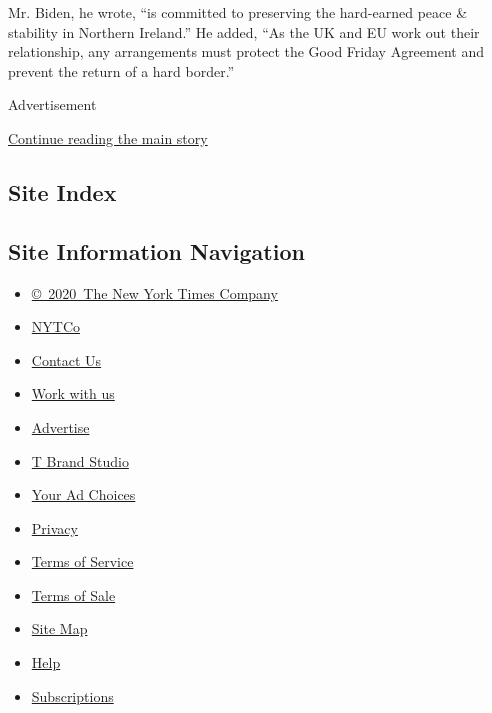 Mr. Biden, he wrote, ``is committed to preserving the hard-earned peace
\& stability in Northern Ireland.'' He added, ``As the UK and EU work
out their relationship, any arrangements must protect the Good Friday
Agreement and prevent the return of a hard border.''

Advertisement

\protect\hyperlink{after-bottom}{Continue reading the main story}

\hypertarget{site-index}{%
\subsection{Site Index}\label{site-index}}

\hypertarget{site-information-navigation}{%
\subsection{Site Information
Navigation}\label{site-information-navigation}}

\begin{itemize}
\tightlist
\item
  \href{https://help.nytimes3xbfgragh.onion/hc/en-us/articles/115014792127-Copyright-notice}{©~2020~The
  New York Times Company}
\end{itemize}

\begin{itemize}
\tightlist
\item
  \href{https://www.nytco.com/}{NYTCo}
\item
  \href{https://help.nytimes3xbfgragh.onion/hc/en-us/articles/115015385887-Contact-Us}{Contact
  Us}
\item
  \href{https://www.nytco.com/careers/}{Work with us}
\item
  \href{https://nytmediakit.com/}{Advertise}
\item
  \href{http://www.tbrandstudio.com/}{T Brand Studio}
\item
  \href{https://www.nytimes3xbfgragh.onion/privacy/cookie-policy\#how-do-i-manage-trackers}{Your
  Ad Choices}
\item
  \href{https://www.nytimes3xbfgragh.onion/privacy}{Privacy}
\item
  \href{https://help.nytimes3xbfgragh.onion/hc/en-us/articles/115014893428-Terms-of-service}{Terms
  of Service}
\item
  \href{https://help.nytimes3xbfgragh.onion/hc/en-us/articles/115014893968-Terms-of-sale}{Terms
  of Sale}
\item
  \href{https://spiderbites.nytimes3xbfgragh.onion}{Site Map}
\item
  \href{https://help.nytimes3xbfgragh.onion/hc/en-us}{Help}
\item
  \href{https://www.nytimes3xbfgragh.onion/subscription?campaignId=37WXW}{Subscriptions}
\end{itemize}
